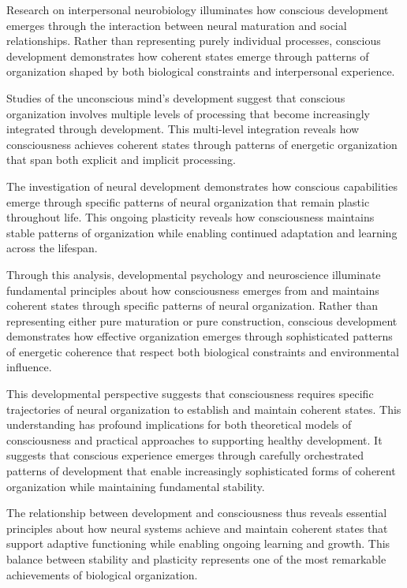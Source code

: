 \begin{refsection}
Research on interpersonal neurobiology \cite{Siegel2020} illuminates how conscious development emerges through the interaction between neural maturation and social relationships. Rather than representing purely individual processes, conscious development demonstrates how coherent states emerge through patterns of organization shaped by both biological constraints and interpersonal experience.

Studies of the unconscious mind's development \cite{Schore2019} suggest that conscious organization involves multiple levels of processing that become increasingly integrated through development. This multi-level integration reveals how consciousness achieves coherent states through patterns of energetic organization that span both explicit and implicit processing.

The investigation of neural development \cite{Quartz2002} demonstrates how conscious capabilities emerge through specific patterns of neural organization that remain plastic throughout life. This ongoing plasticity reveals how consciousness maintains stable patterns of organization while enabling continued adaptation and learning across the lifespan.

Through this analysis, developmental psychology and neuroscience illuminate fundamental principles about how consciousness emerges from and maintains coherent states through specific patterns of neural organization. Rather than representing either pure maturation or pure construction, conscious development demonstrates how effective organization emerges through sophisticated patterns of energetic coherence that respect both biological constraints and environmental influence.

This developmental perspective suggests that consciousness requires specific trajectories of neural organization to establish and maintain coherent states. This understanding has profound implications for both theoretical models of consciousness and practical approaches to supporting healthy development. It suggests that conscious experience emerges through carefully orchestrated patterns of development that enable increasingly sophisticated forms of coherent organization while maintaining fundamental stability.

The relationship between development and consciousness thus reveals essential principles about how neural systems achieve and maintain coherent states that support adaptive functioning while enabling ongoing learning and growth. This balance between stability and plasticity represents one of the most remarkable achievements of biological organization.


\end{refsection}
